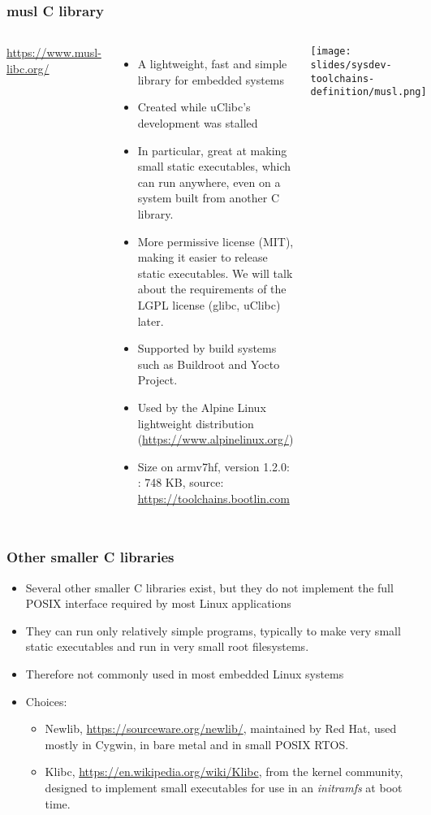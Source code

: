 \begin{frame}
  \frametitle{musl C library}
  \begin{columns}[T]
      \url{https://www.musl-libc.org/}
      \begin{itemize}
      \item A lightweight, fast and simple library for embedded systems
      \item Created while uClibc's development was stalled
      \item In particular, great at making small static executables,
	    which can run anywhere, even on a system built
            from another C library.
      \item More permissive license (MIT), making it easier to release
            static executables. We will talk about the requirements
            of the LGPL license (glibc, uClibc) later.
      \item Supported by build systems such as Buildroot and Yocto
        Project.
      \item Used by the Alpine Linux lightweight distribution
        (\url{https://www.alpinelinux.org/})
      \item Size on armv7hf, version 1.2.0:
        : 748 KB, source: \url{https://toolchains.bootlin.com}
      \end{itemize}
    \texttt{[image: slides/sysdev-toolchains-definition/musl.png]}
  \end{columns}
\end{frame}

\begin{frame}
  \frametitle{Other smaller C libraries}
  \begin{itemize}
  \item Several other smaller C libraries exist, but they do not
    implement the full POSIX interface required by most Linux
    applications
  \item They can run only relatively simple programs, typically to
    make very small static executables and run in very small root
    filesystems.
  \item Therefore not commonly used in most embedded Linux systems
  \item Choices:
    \begin{itemize}
    \item Newlib, \url{https://sourceware.org/newlib/}, maintained by
      Red Hat, used mostly in Cygwin, in bare metal and in small POSIX
      RTOS.
    \item Klibc, \url{https://en.wikipedia.org/wiki/Klibc}, from the
      kernel community, designed to implement small executables for
      use in an {\em initramfs} at boot time.
    \end{itemize}
  \end{itemize}
\end{frame}


